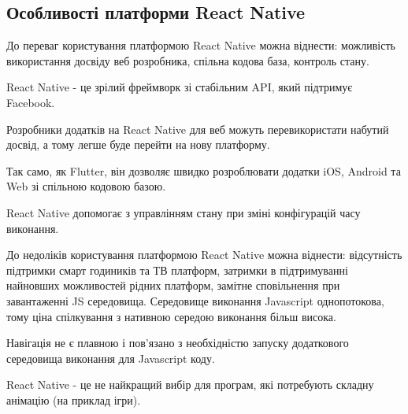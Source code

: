 \subsection{Особливості платформи React Native}
\label{subsec:rn_pros_cons}

До переваг користування платформою React Native можна віднести:
можливість використання досвіду веб розробника,
спільна кодова база,
контроль стану.

React Native - це зрілий фреймворк зі стабільним API, який підтримує Facebook.

Розробники додатків на React Native для веб можуть перевикористати набутий досвід, а тому легше буде перейти на нову платформу.

Так само, як Flutter, він дозволяє швидко розроблювати додатки iOS, Android та Web зі спільною кодовою базою.

React Native допомогає з управлінням стану при зміні конфігурацій часу виконання.

До недоліків користування платформою React Native можна віднести:
відсутність підтримки смарт годиників та ТВ платформ,
затримки в підтримуванні найновших можливостей рідних платформ,
замітне сповільнення при завантаженні JS середовища.
Середовище виконання Javascript однопотокова, тому ціна спілкування з нативною середою
виконання більш висока.

Навігація не є плавною і пов'язано з необхідністю запуску додаткового середовища виконання для Javascript коду.

React Native - це не найкращий вибір для програм, які потребують складну анімацію (на приклад ігри).

